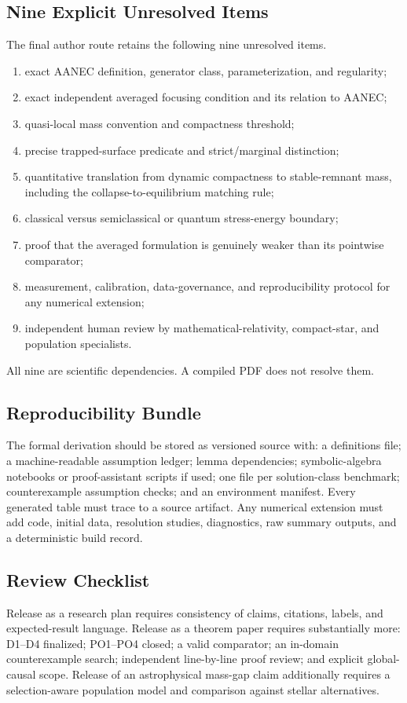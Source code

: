 \documentclass[conference]{IEEEtran}
\begin{document}
\subsection{Nine Explicit Unresolved Items}
The final author route retains the following nine unresolved items.
\begin{enumerate}
\item exact AANEC definition, generator class, parameterization, and regularity;
\item exact independent averaged focusing condition and its relation to AANEC;
\item quasi-local mass convention and compactness threshold;
\item precise trapped-surface predicate and strict/marginal distinction;
\item quantitative translation from dynamic compactness to stable-remnant mass, including the collapse-to-equilibrium matching rule;
\item classical versus semiclassical or quantum stress-energy boundary;
\item proof that the averaged formulation is genuinely weaker than its pointwise comparator;
\item measurement, calibration, data-governance, and reproducibility protocol for any numerical extension;
\item independent human review by mathematical-relativity, compact-star, and population specialists.
\end{enumerate}
All nine are scientific dependencies. A compiled PDF does not resolve them.

\subsection{Reproducibility Bundle}
The formal derivation should be stored as versioned source with: a definitions file; a machine-readable assumption ledger; lemma dependencies; symbolic-algebra notebooks or proof-assistant scripts if used; one file per solution-class benchmark; counterexample assumption checks; and an environment manifest. Every generated table must trace to a source artifact. Any numerical extension must add code, initial data, resolution studies, diagnostics, raw summary outputs, and a deterministic build record.

\subsection{Review Checklist}
Release as a research plan requires consistency of claims, citations, labels, and expected-result language. Release as a theorem paper requires substantially more: D1--D4 finalized; PO1--PO4 closed; a valid comparator; an in-domain counterexample search; independent line-by-line proof review; and explicit global-causal scope. Release of an astrophysical mass-gap claim additionally requires a selection-aware population model and comparison against stellar alternatives.
\end{document}
